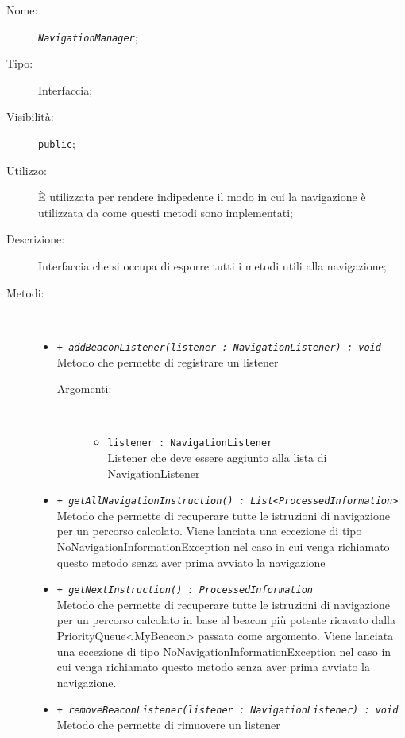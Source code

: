 \documentclass[../DefinizioneDiProdotto.tex]{subfiles}
\begin{document}
    \begin{description}
\item[Nome:] \texttt{\textit{NavigationManager}};
\item[Tipo:] Interfaccia;
\item[Visibilità:] \texttt{public};
\item[Utilizzo:] È utilizzata per rendere indipedente il modo in cui la navigazione è utilizzata da come questi metodi sono implementati;
\item[Descrizione:] Interfaccia che si occupa di esporre tutti i metodi utili alla navigazione;
\item[Metodi:] \
\begin{itemize}
\item \texttt{+ \textit{addBeaconListener(listener : NavigationListener) : void}}\\
Metodo che permette di registrare un listener
 \begin{description}
\item[Argomenti:] \
\begin{itemize}
\item \texttt{listener : NavigationListener}\\
Listener che deve essere aggiunto alla lista di NavigationListener\end{itemize}
\end{description}
\item \texttt{+ \textit{getAllNavigationInstruction() : List<ProcessedInformation>}}\\
Metodo che permette di recuperare tutte le istruzioni di navigazione per un percorso calcolato. Viene lanciata una eccezione di tipo NoNavigationInformationException nel caso in cui venga richiamato questo metodo senza aver prima avviato la navigazione
 \item \texttt{+ \textit{getNextInstruction() : ProcessedInformation}}\\
Metodo che permette di recuperare tutte le istruzioni di navigazione per un percorso calcolato in base al beacon più potente ricavato dalla PriorityQueue<MyBeacon> passata come argomento. Viene lanciata una eccezione di tipo NoNavigationInformationException nel caso in cui venga richiamato questo metodo senza aver prima avviato la navigazione.
 \item \texttt{+ \textit{removeBeaconListener(listener : NavigationListener) : void}}\\
Metodo che permette di rimuovere un listener
 \begin{description}

\end{description}
\end{itemize}
\end{description}
\end{document}
